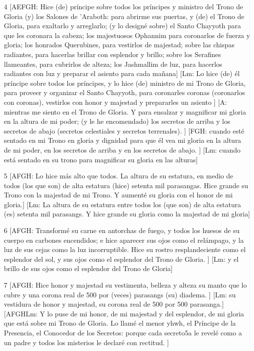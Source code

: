 \par 4 [AEFGH: Hice (de) príncipe sobre todos los príncipes y ministro del Trono de Gloria (y) los Salones de 'Araboth: para abrirme sus puertas, y (de) el Trono de Gloria, para exaltarlo y arreglarlo; (y lo designé sobre) el Santo Chayyoth para que les coronara la cabeza; los majestuosos Ophannim para coronarlos de fuerza y ​​gloria; los honrados Querubines, para vestirlos de majestad; sobre las chispas radiantes, para hacerlas brillar con esplendor y brillo; sobre los Serafines llameantes, para cubrirlos de alteza; los Jashmallim de luz, para hacerlos radiantes con luz y preparar el asiento para cada mañana] [Lm: Lo hice (de) él príncipe sobre todos los príncipes, y lo hice (de) ministro de mi Trono de Gloria, para proveer y organizar el Santo Chayyoth, para coronarles coronas (coronarlos con coronas), vestirlos con honor y majestad y prepararles un asiento ] [A: mientras me siento en el Trono de Gloria. Y para ensalzar y magnificar mi gloria en la altura de mi poder; (y le he encomendado) los secretos de arriba y los secretos de abajo (secretos celestiales y secretos terrenales). ] [FGH: cuando esté sentado en mi Trono en gloria y dignidad para que él vea mi gloria en la altura de mi poder, en los secretos de arriba y en los secretos de abajo. ] [Lm: cuando está sentado en su trono para magnificar su gloria en las alturas]

\par 5 [AFGH: Lo hice más alto que todos. La altura de su estatura, en medio de todos (los que son) de alta estatura (hice) setenta mil parasangas. Hice grande su Trono con la majestad de mi Trono. Y aumenté su gloria con el honor de mi gloria.] [Lm: La altura de su estatura entre todos los (que son) de alta estatura (es) setenta mil parasangs. Y hice grande su gloria como la majestad de mi gloria]

\par 6 [AFGH: Transformé su carne en antorchas de fuego, y todos los huesos de su cuerpo en carbones encendidos; e hice aparecer sus ojos como el relámpago, y la luz de sus cejas como la luz incorruptible. Hice su rostro resplandeciente como el esplendor del sol, y sus ojos como el esplendor del Trono de Gloria. ] [Lm: y el brillo de sus ojos como el esplendor del Trono de Gloria]

\par 7 [AFGH: Hice honor y majestad su vestimenta, belleza y alteza su manto que lo cubre y una corona real de 500 por (veces) parasangs (su) diadema. ] [Lm: su vestidura de honor y majestad, su corona real de 500 por 500 parasanga.] [AFGHLm: Y lo puse de mi honor, de mi majestad y del esplendor, de mi gloria que está sobre mi Trono de Gloria. Lo llamé el menor yhwh, el Príncipe de la Presencia, el Conocedor de los Secretos: porque cada secreto5a le revelé como a un padre y todos los misterios le declaré con rectitud. ]

